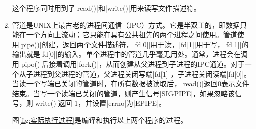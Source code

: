 \documentclass[cs4size,a4paper,nofonts]{ctexart}
\begin{document}
\begin{enumerate}
这个程序同时用到了|read()|和|write()|用来读写文件描述符。

\item 管道是UNIX上最古老的进程间通信（IPC）方式。它是半双工的，即数据只能在一个方向上流动；它只能在具有公共祖先的两个进程之间使用。管道使用|pipe()|创建，返回两个文件描述符，|fd[0]|用于读，|fd[1]|用于写，|fd[1]|的输出就是|fd[0]|的输入。单个进程中的管道几乎毫无用处。通常，进程会在调用|pipo()|后接着调用|fork()|，从而创建从父进程到子进程的IPC通道。对于一个从子进程到父进程的管道，父进程关闭写端|fd[1]|，子进程关闭读端|fd[0]|。当读一个写端已关闭的管道时，在所有数据被读取后，|read()|返回0表示文件结束。当写一个读端已关闭的管道，则产生信号|SIGPIPE|，如果忽略该信号，则|write()|返回-1，并设置|errno|为|EPIPE|。


\begin{figure}[htp]
\end{figure}

图\ref{fig:实际执行过程}是编译和执行以上两个程序的过程。

\end{enumerate}
\end{document}

